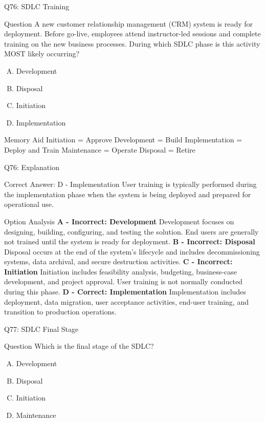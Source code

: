 \documentclass{beamer}
\begin{document}
	
	\begin{frame}{Q76: SDLC Training} \begin{block}{Question} A new customer relationship management (CRM) system is ready for deployment. Before go-live, employees attend instructor-led sessions and complete training on the new business processes. During which SDLC phase is this activity MOST likely occurring? \end{block} \begin{enumerate}[(A)] \item Development \item Disposal \item Initiation \item Implementation \end{enumerate} \begin{block}{Memory Aid} Initiation = Approve Development = Build Implementation = Deploy and Train Maintenance = Operate Disposal = Retire \end{block}  \end{frame} \begin{frame}{Q76: Explanation} \footnotesize \begin{block}{Correct Answer: D - Implementation} User training is typically performed during the implementation phase when the system is being deployed and prepared for operational use. \end{block} \begin{block}{Option Analysis} \textbf{A - Incorrect: Development} Development focuses on designing, building, configuring, and testing the solution. End users are generally not trained until the system is ready for deployment. \vspace{0.15cm} \textbf{B - Incorrect: Disposal} Disposal occurs at the end of the system's lifecycle and includes decommissioning systems, data archival, and secure destruction activities. \vspace{0.15cm} \textbf{C - Incorrect: Initiation} Initiation includes feasibility analysis, budgeting, business-case development, and project approval. User training is not normally conducted during this phase. \vspace{0.15cm} \textbf{D - Correct: Implementation} Implementation includes deployment, data migration, user acceptance activities, end-user training, and transition to production operations. \end{block} \end{frame}
	
	\begin{frame}{Q77: SDLC Final Stage}
		\begin{block}{Question}
			Which is the final stage of the SDLC?
		\end{block}
		\begin{enumerate}[(A)]
			\item Development
			\item Disposal
			\item Initiation
			\item Maintenance
		\end{enumerate}
	\end{frame}
	
\end{document}
